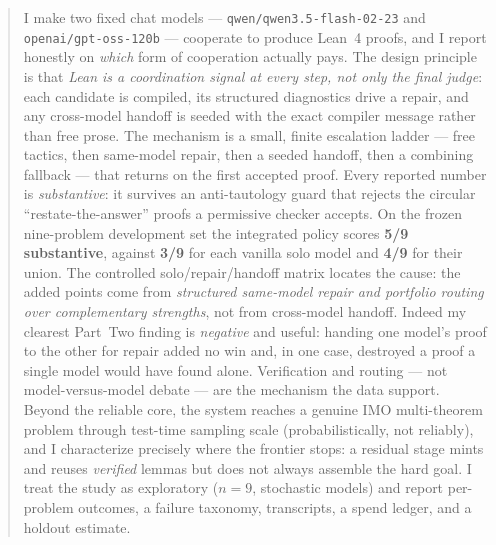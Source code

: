 \begin{abstract}
\noindent
I make two fixed chat models --- \nolinkurl{qwen/qwen3.5-flash-02-23} and
\nolinkurl{openai/gpt-oss-120b} --- cooperate to produce Lean~4 proofs, and I
report honestly on \emph{which} form of cooperation actually pays. The design
principle is that \emph{Lean is a coordination signal at every step, not only the
final judge}: each candidate is compiled, its structured diagnostics drive a
repair, and any cross-model handoff is seeded with the exact compiler message
rather than free prose. The mechanism is a small, finite escalation ladder ---
free tactics, then same-model repair, then a seeded handoff, then a combining
fallback --- that returns on the first accepted proof. Every reported number is
\emph{substantive}: it survives an anti-tautology guard that rejects the circular
``restate-the-answer'' proofs a permissive checker accepts. On the frozen
nine-problem development set the integrated policy scores \textbf{5/9 substantive},
against \textbf{3/9} for each vanilla solo model and \textbf{4/9} for their union.
The controlled solo/repair/handoff matrix locates the cause: the added points come
from \emph{structured same-model repair and portfolio routing over complementary
strengths}, not from cross-model handoff. Indeed my clearest Part~Two finding is
\emph{negative} and useful: handing one model's proof to the other for repair
added no win and, in one case, destroyed a proof a single model would have found
alone. Verification and routing --- not model-versus-model debate --- are the
mechanism the data support. Beyond the reliable core, the system reaches a genuine
IMO multi-theorem problem through test-time sampling scale (probabilistically, not
reliably), and I characterize precisely where the frontier stops: a residual stage
mints and reuses \emph{verified} lemmas but does not always assemble the hard goal.
I treat the study as exploratory ($n=9$, stochastic models) and report per-problem
outcomes, a failure taxonomy, transcripts, a spend ledger, and a holdout estimate.
\end{abstract}
